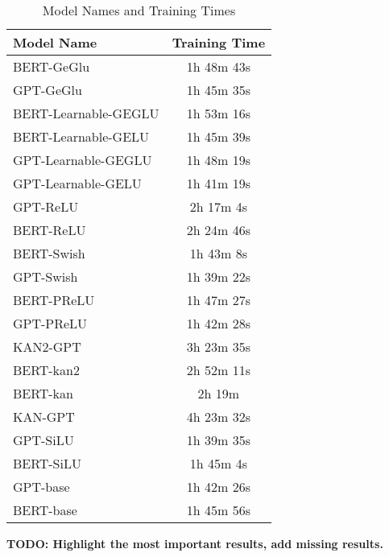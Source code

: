     \begin{table}[h!]
        \centering
        \begin{tabular}{|l|c|}
        \hline
        \textbf{Model Name} & \textbf{Training Time} \\ \hline
        BERT-GeGlu & 1h 48m 43s \\ \hline
        GPT-GeGlu & 1h 45m 35s \\ \hline
        BERT-Learnable-GEGLU & 1h 53m 16s \\ \hline
        BERT-Learnable-GELU & 1h 45m 39s \\ \hline
        GPT-Learnable-GEGLU & 1h 48m 19s \\ \hline
        GPT-Learnable-GELU & 1h 41m 19s \\ \hline
        GPT-ReLU & 2h 17m 4s \\ \hline
        BERT-ReLU & 2h 24m 46s \\ \hline
        BERT-Swish & 1h 43m 8s \\ \hline
        GPT-Swish & 1h 39m 22s \\ \hline
        BERT-PReLU & 1h 47m 27s \\ \hline
        GPT-PReLU & 1h 42m 28s \\ \hline
        KAN2-GPT & 3h 23m 35s \\ \hline
        BERT-kan2 & 2h 52m 11s \\ \hline
        BERT-kan & 2h 19m \\ \hline
        KAN-GPT & 4h 23m 32s \\ \hline
        GPT-SiLU & 1h 39m 35s \\ \hline
        BERT-SiLU & 1h 45m 4s \\ \hline
        GPT-base & 1h 42m 26s \\ \hline
        BERT-base & 1h 45m 56s \\ \hline
        \end{tabular}
        \caption{Model Names and Training Times}
        \label{tab:training-times}
        \end{table}
\textbf{TODO: Highlight the most important results, add missing results.}
\newpage